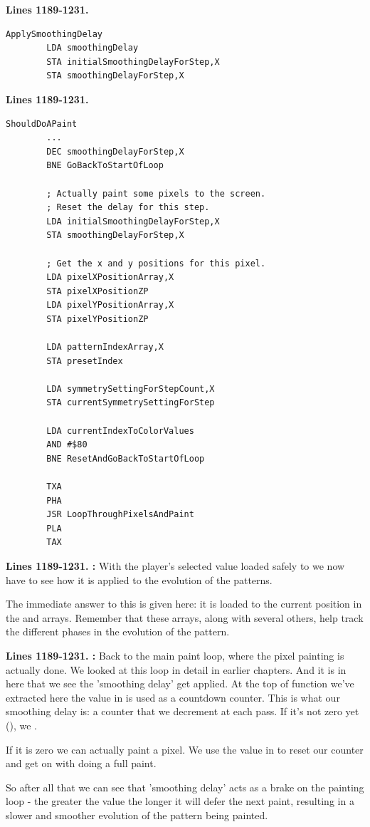 \textbf{Lines 1189-1231. }
\begin{lstlisting}[caption=From \icode{MainInterruptHandler}.]
ApplySmoothingDelay    
        LDA smoothingDelay
        STA initialSmoothingDelayForStep,X
        STA smoothingDelayForStep,X
\end{lstlisting}
\textbf{Lines 1189-1231. }
\begin{lstlisting}[caption=From \icode{MainPaintLoop}.]
ShouldDoAPaint   
        ...
        DEC smoothingDelayForStep,X
        BNE GoBackToStartOfLoop

        ; Actually paint some pixels to the screen.
        ; Reset the delay for this step.
        LDA initialSmoothingDelayForStep,X
        STA smoothingDelayForStep,X

        ; Get the x and y positions for this pixel.
        LDA pixelXPositionArray,X
        STA pixelXPositionZP
        LDA pixelYPositionArray,X
        STA pixelYPositionZP

        LDA patternIndexArray,X
        STA presetIndex

        LDA symmetrySettingForStepCount,X
        STA currentSymmetrySettingForStep

        LDA currentIndexToColorValues
        AND #$80
        BNE ResetAndGoBackToStartOfLoop

        TXA 
        PHA 
        JSR LoopThroughPixelsAndPaint
        PLA 
        TAX 
\end{lstlisting}
\clearpage

\textbf{Lines 1189-1231. :} With the player's selected value loaded 
safely to  we now have to see how it is applied to the evolution of the patterns.

The immediate answer to this is given here: it is loaded to the current position in the 
 and  arrays. Remember that these
arrays, along with several others, help track the different phases in the evolution of the pattern.


\textbf{Lines 1189-1231. :}  Back to the main paint loop, where the
pixel painting is actually done. We looked at this loop in detail in earlier chapters. And it is in
here that we see the 'smoothing delay' get applied. At the top of function we've extracted here
the value in  is used as a countdown counter. This is what our
smoothing delay is: a counter that we decrement at each pass. If it's not zero yet (),
we .

If it is zero we can actually paint a pixel. We use the value in 
to reset our counter and get on with doing a full paint.

So after all that we can see that 'smoothing delay' acts as a brake on the painting loop - the greater
the value the longer it will defer the next paint, resulting in a slower and smoother evolution of the
pattern being painted.

